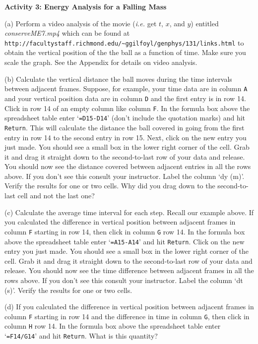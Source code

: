 \textbf{Activity 3: Energy Analysis for a Falling Mass}

(a) Perform a video analysis of the movie ({\it i.e.} get $t$, $x$, and $y$) entitled 
{\it conserveME7.mp4} which can be found at
\verb!http://facultystaff.richmond.edu/~ggilfoyl/genphys/131/links.html!
\noindent to obtain the vertical position of the the ball as a function of time. 
Make sure you scale the graph.
See the Appendix for details on video analysis.

(b) Calculate the vertical distance the ball moves during the time intervals between adjacent frames.
Suppose, for example, your time data are in column {\tt A} and your vertical position data are in 
column {\tt D} and the first entry is in row 14. 
Click in row 14 of an empty column like column {\tt F}.
In the formula box above the spreadsheet table enter `{\tt =D15-D14}' (don't include the quotation marks) 
and hit {\tt Return}.
This will calculate the distance the ball covered in going from the first entry in row 14 to the second entry 
in row 15.
Next, click on the new entry you just made. You should see a small box in the lower right corner of the cell.
Grab it and drag it straight down to the second-to-last row of your data and release.
You should now see the distance covered between adjacent entries in all the rows above. 
If you don't see this consult your instructor.
Label the column `dy (m)'.
Verify the results for one or two cells.
Why did you drag down to the second-to-last cell and not the last one?

\vspace{2.0cm}

(c) Calculate the average time interval for each step. Recall our example above.
If you calculated the difference in vertical position between adjacent frames in 
column {\tt F} starting in row 14, then
click in column {\tt G} row 14. 
In the formula box above the spreadsheet table enter `{\tt =A15-A14}' and hit {\tt Return}.
Click on the new entry you just made. You should see a small box in the lower right corner of the cell.
Grab it and drag it straight down to the second-to-last row of your data and release.
You should now see the time difference between adjacent frames in all the rows above. 
If you don't see this consult your instructor.
Label the column `dt (s)'.
Verify the results for one or two cells.

(d)  If you calculated the difference in vertical position between adjacent frames in 
column {\tt F} starting in row 14 and the difference in time in column {\tt G}, then
click in column {\tt H} row 14.
In the formula box above the spreadsheet table enter `{\tt =F14/G14}' and hit {\tt Return}.
What is this quantity?

